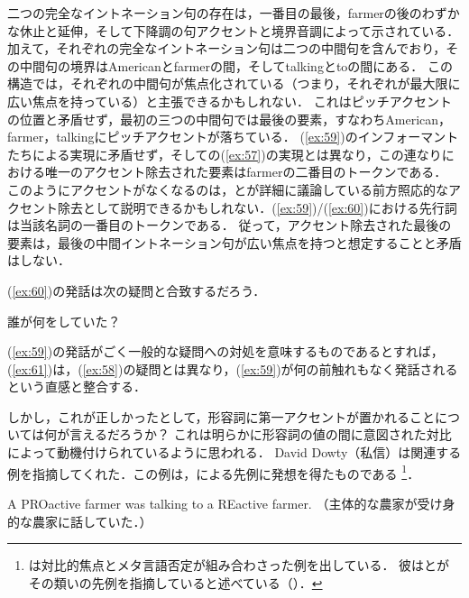 \documentclass{goken}
\newcommand{\ori}[1]{\noindent\textcolor[gray]{0.7}{\fontsize{8pt}{8pt}\selectfont{\textsf{(p.~#1)}}} }
\begin{document}
\noindent
二つの完全なイントネーション句の存在は，一番目の最後，farmerの後のわずかな休止と延伸，そして下降調の句アクセントと境界音調によって示されている．
加えて，それぞれの完全なイントネーション句は二つの中間句を含んでおり，その中間句の境界はAmericanとfarmerの間，そしてtalkingとtoの間にある．
この構造では，それぞれの中間句が焦点化されている（つまり，それぞれが最大限に広い焦点を持っている）と主張できるかもしれない．
これはピッチアクセントの位置と矛盾せず，最初の三つの中間句では最後の要素，すなわちAmerican，farmer，talkingにピッチアクセントが落ちている．
(\ref{ex:59})のインフォーマントたちによる実現に矛盾せず，そして\citeauthor{Rooth1992a}の(\ref{ex:57})の実現とは異なり，この連なりにおける唯一のアクセント除去された要素はfarmerの二番目のトークンである．
このようにアクセントがなくなるのは，\citet{Ladd1980}と\citet{Selkirk1984}が詳細に議論している前方照応的なアクセント除去として説明できるかもしれない．(\ref{ex:59})/(\ref{ex:60})における先行詞は当該名詞の一番目のトークンである．
従って，アクセント除去された最後の要素は，最後の中間イントネーション句が広い焦点を持つと想定することと矛盾はしない．

(\ref{ex:60})の発話は次の疑問と合致するだろう．

\begin{exe}
	\ex\label{ex:61}
	誰が何をしていた？%
\end{exe}

\noindent
(\ref{ex:59})の発話がごく一般的な疑問への対処を意味するものであるとすれば，(\ref{ex:61})は，(\ref{ex:58})の疑問とは異なり，(\ref{ex:59})が何の前触れもなく発話されるという直感と整合する．

しかし，これが正しかったとして，形容詞に第一アクセントが置かれることについては何が言えるだろうか？
これは明らかに形容詞の値の間に意図された対比によって動機付けられているように思われる．
David Dowty（私信）は関連する例を指摘してくれた．この例は，\citet{Horn1985,Horn1989}による先例に発想を得たものである\ori{56}
\footnote{%
  \citeauthor{Horn1985}は対比的焦点とメタ言語否定が組み合わさった例を出している．
  彼は\citet{Bolinger1961}と\citet{Carlson1982}がその類いの先例を指摘していると述べている（\citealt[434--435]{Horn1989}）．
}．

\begin{exe}
	\ex\label{ex:62}
  A PROactive farmer was talking to a REactive farmer. （主体的な農家が受け身的な農家に話していた．）
\end{exe}
\end{document}
